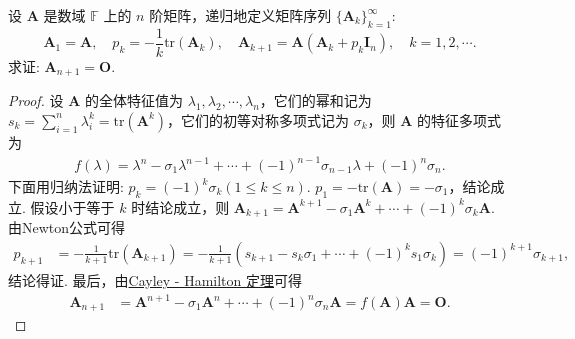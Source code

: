 \documentclass[../../main.tex]{subfiles}
\begin{document}
\begin{example}
设 $\boldsymbol{A}$ 是数域 $\mathbb{F}$ 上的 $n$ 阶矩阵，递归地定义矩阵序列 $\{\boldsymbol{A}_k\}_{k = 1}^{\infty}$:
\[
\boldsymbol{A}_1=\boldsymbol{A}, \quad
p_k=-\frac{1}{k}\mathrm{tr}(\boldsymbol{A}_k), \quad
\boldsymbol{A}_{k + 1}=\boldsymbol{A}(\boldsymbol{A}_k + p_k\boldsymbol{I}_n), \quad k = 1,2,\cdots.
\]
求证: $\boldsymbol{A}_{n + 1}=\boldsymbol{O}$.
\end{example}
\begin{proof}
设 $\boldsymbol{A}$ 的全体特征值为 $\lambda_1,\lambda_2,\cdots,\lambda_n$，它们的幂和记为 $s_k=\sum_{i = 1}^{n}\lambda_i^k=\mathrm{tr}(\boldsymbol{A}^k)$，它们的初等对称多项式记为 $\sigma_k$，则 $\boldsymbol{A}$ 的特征多项式为
\begin{align*}
f(\lambda)=\lambda^n - \sigma_1\lambda^{n - 1}+\cdots + (-1)^{n - 1}\sigma_{n - 1}\lambda + (-1)^n\sigma_n.
\end{align*}
下面用归纳法证明: $p_k = (-1)^k\sigma_k (1\leq k\leq n)$. $p_1 = -\mathrm{tr}(\boldsymbol{A}) = -\sigma_1$，结论成立. 假设小于等于 $k$ 时结论成立，则 $\boldsymbol{A}_{k + 1}=\boldsymbol{A}^{k + 1} - \sigma_1\boldsymbol{A}^k+\cdots + (-1)^k\sigma_k\boldsymbol{A}$. 由Newton公式可得
\begin{align*}
p_{k + 1}&=-\frac{1}{k + 1}\mathrm{tr}(\boldsymbol{A}_{k + 1})=-\frac{1}{k + 1}(s_{k + 1} - s_k\sigma_1+\cdots + (-1)^k s_1\sigma_k)=(-1)^{k + 1}\sigma_{k + 1},
\end{align*}
结论得证. 最后，由\hyperref[theorem:Cayley-Hamilton定理]{Cayley - Hamilton 定理}可得
\begin{align*}
\boldsymbol{A}_{n + 1}&=\boldsymbol{A}^{n + 1} - \sigma_1\boldsymbol{A}^n+\cdots + (-1)^n\sigma_n\boldsymbol{A}=f(\boldsymbol{A})\boldsymbol{A}=\boldsymbol{O}.
\end{align*} 
\end{proof}
\end{document}
